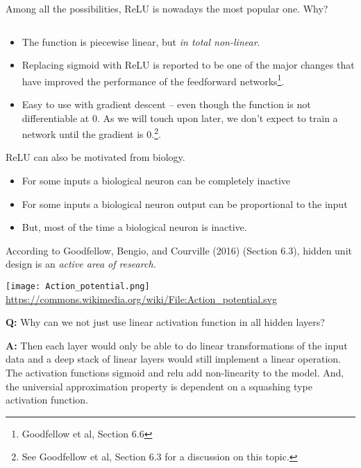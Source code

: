 \documentclass[10pt,ignorenonframetext,]{beamer}
\providecommand{\tightlist}{%
  \setlength{\itemsep}{0pt}\setlength{\parskip}{0pt}}
\begin{document}
\begin{frame}

Among all the possibilities, ReLU is nowadays the most popular one. Why?

\(~\)

\begin{itemize}
\item
  The function is piecewise linear, but \emph{in total non-linear}.
\item
  Replacing sigmoid with ReLU is reported to be one of the major changes
  that have improved the performance of the feedforward
  networks\footnote{Goodfellow et al, Section 6.6}.
\item
  Easy to use with gradient descent -- even though the function is not
  differentiable at 0. As we will touch upon later, we don't expect to
  train a network until the gradient is
  0.\footnote{See Goodfellow et al, Section 6.3 for a discussion on this topic.}.
\end{itemize}

\end{frame}

\begin{frame}

ReLU can also be motivated from biology.

\begin{itemize}
\tightlist
\item
  For some inputs a biological neuron can be completely inactive
\item
  For some inputs a biological neuron output can be proportional to the
  input
\item
  But, most of the time a biological neuron is inactive.
\end{itemize}

According to Goodfellow, Bengio, and Courville (2016) (Section 6.3),
hidden unit design is an \emph{active area of research.}

\centering
\texttt{[image: Action\_potential.png]}
\small
\url{https://commons.wikimedia.org/wiki/File:Action_potential.svg}

\end{frame}

\begin{frame}

\textbf{Q:} Why can we not just use linear activation function in all
hidden layers?

\textbf{A:} Then each layer would only be able to do linear
transformations of the input data and a deep stack of linear layers
would still implement a linear operation. The activation functions
sigmoid and relu add non-linearity to the model. And, the universial
approximation property is dependent on a squashing type activation
function.

\end{frame}
\end{document}
